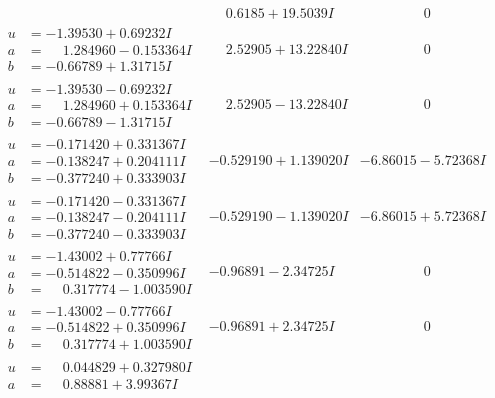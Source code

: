 \documentclass[1p]{elsarticle_modified}
\theoremstyle{definition}
\begin{document}
$$\begin{array}{c|c|c}
 & \phantom{-}0.6185 + 19.5039 I & \phantom{-0.000000 } 0 \\ \hline\begin{aligned}
u &= -1.39530 + 0.69232 I \\
a &= \phantom{-}1.284960 - 0.153364 I \\
b &= -0.66789 + 1.31715 I\end{aligned}
 & \phantom{-}2.52905 + 13.22840 I & \phantom{-0.000000 } 0 \\ \hline\begin{aligned}
u &= -1.39530 - 0.69232 I \\
a &= \phantom{-}1.284960 + 0.153364 I \\
b &= -0.66789 - 1.31715 I\end{aligned}
 & \phantom{-}2.52905 - 13.22840 I & \phantom{-0.000000 } 0 \\ \hline\begin{aligned}
u &= -0.171420 + 0.331367 I \\
a &= -0.138247 + 0.204111 I \\
b &= -0.377240 + 0.333903 I\end{aligned}
 & -0.529190 + 1.139020 I & -6.86015 - 5.72368 I \\ \hline\begin{aligned}
u &= -0.171420 - 0.331367 I \\
a &= -0.138247 - 0.204111 I \\
b &= -0.377240 - 0.333903 I\end{aligned}
 & -0.529190 - 1.139020 I & -6.86015 + 5.72368 I \\ \hline\begin{aligned}
u &= -1.43002 + 0.77766 I \\
a &= -0.514822 - 0.350996 I \\
b &= \phantom{-}0.317774 - 1.003590 I\end{aligned}
 & -0.96891 - 2.34725 I & \phantom{-0.000000 } 0 \\ \hline\begin{aligned}
u &= -1.43002 - 0.77766 I \\
a &= -0.514822 + 0.350996 I \\
b &= \phantom{-}0.317774 + 1.003590 I\end{aligned}
 & -0.96891 + 2.34725 I & \phantom{-0.000000 } 0 \\ \hline\begin{aligned}
u &= \phantom{-}0.044829 + 0.327980 I \\
a &= \phantom{-}0.88881 + 3.99367 I \\

\end{aligned}
\end{array}$$
\end{document}
